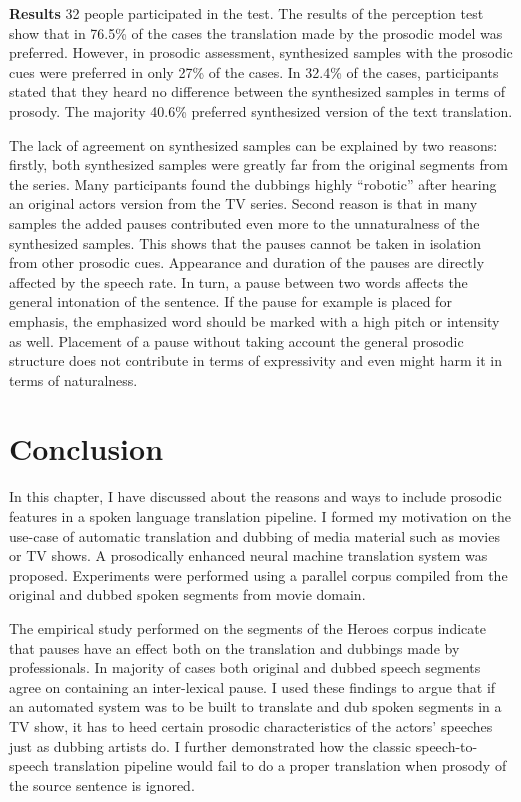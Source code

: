 
\textbf{Results} 32 people participated in the test. The results of the perception test show that in 76.5\% of the cases the translation made by the prosodic model was preferred. However, in prosodic assessment, synthesized samples with the prosodic cues were preferred in only 27\% of the cases. In 32.4\% of the cases, participants stated that they heard no difference between the synthesized samples in terms of prosody. The majority 40.6\% preferred synthesized version of the text translation. 

The lack of agreement on synthesized samples can be explained by two reasons: firstly, both synthesized samples were greatly far from the original segments from the series. Many participants found the dubbings highly ``robotic'' after hearing an original actors version from the TV series. Second reason is that in many samples the added pauses contributed even more to the unnaturalness of the synthesized samples. This shows that the pauses cannot be taken in isolation from other prosodic cues. Appearance and duration of the pauses are directly affected by the speech rate. In turn, a pause between two words affects the general intonation of the sentence. If the pause for example is placed for emphasis, the emphasized word should be marked with a high pitch or intensity as well. Placement of a pause without taking account the general prosodic structure does not contribute in terms of expressivity and even might harm it in terms of naturalness. 


\section{Conclusion}

In this chapter, I have discussed about the reasons and ways to include prosodic features in a spoken language translation pipeline. I formed my motivation on the use-case of automatic translation and dubbing of media material such as movies or TV shows. A prosodically enhanced neural machine translation system was proposed. Experiments were performed using a parallel corpus compiled from the original and dubbed spoken segments from movie domain.

The empirical study performed on the segments of the Heroes corpus indicate that pauses have an effect both on the translation and dubbings made by professionals. In majority of cases both original and dubbed speech segments agree on containing an inter-lexical pause. I used these findings to argue that if an automated system was to be built to translate and dub spoken segments in a TV show, it has to heed certain prosodic characteristics of the actors' speeches just as dubbing artists do. I further demonstrated how the classic speech-to-speech translation pipeline would fail to do a proper translation when prosody of the source sentence is ignored.

